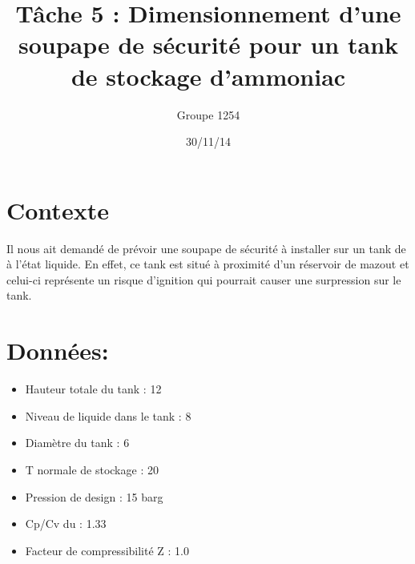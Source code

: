 \documentclass{report}
\title{\textbf{Tâche 5 : Dimensionnement d'une soupape de sécurité pour un tank de stockage d'ammoniac}}
\author{Groupe 1254}
\date{30/11/14}
\begin{document}
\maketitle
\section*{Contexte}
Il nous ait demandé de prévoir une soupape de sécurité à installer sur un tank de  à l'état liquide. En effet, ce tank est situé à proximité d'un réservoir de mazout et celui-ci représente un risque d'ignition qui pourrait causer une surpression sur le tank. 
\section*{\large{Données:}}
\begin{itemize}
\item Hauteur totale du tank : 12\meter
\item Niveau de  liquide dans le tank : 8\meter
\item Diamètre du tank : 6\meter
\item T normale de stockage : 20\celsius
\item Pression de design : 15 barg
\item Cp/Cv du  : 1.33
\item Facteur de compressibilité Z : 1.0
\end{itemize}
\end{document}

